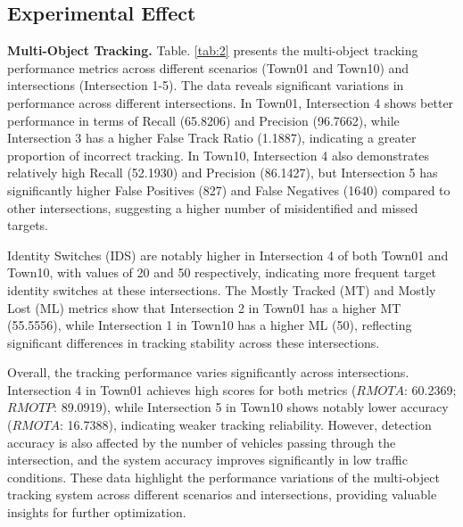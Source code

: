 \documentclass[lettersize,journal]{IEEEtran}
\begin{document}
\subsection{Experimental Effect}

\textbf{Multi-Object Tracking.}
Table. \ref{tab:2} presents the multi-object tracking performance metrics across different scenarios (Town01 and Town10) and intersections (Intersection 1-5). 
The data reveals significant variations in performance across different intersections. 
In Town01, Intersection 4 shows better performance in terms of Recall (65.8206) and Precision (96.7662), while Intersection 3 has a higher False Track Ratio (1.1887), indicating a greater proportion of incorrect tracking. 
In Town10, Intersection 4 also demonstrates relatively high Recall (52.1930) and Precision (86.1427), but Intersection 5 has significantly higher False Positives (827) and False Negatives (1640) compared to other intersections, suggesting a higher number of misidentified and missed targets.

Identity Switches (IDS) are notably higher in Intersection 4 of both Town01 and Town10, with values of 20 and 50 respectively, indicating more frequent target identity switches at these intersections. 
The Mostly Tracked (MT) and Mostly Lost (ML) metrics show that Intersection 2 in Town01 has a higher MT (55.5556), while Intersection 1 in Town10 has a higher ML (50), reflecting significant differences in tracking stability across these intersections.

Overall, the tracking performance varies significantly across intersections. Intersection 4 in Town01 achieves high scores for both metrics (\(RMOTA\): 60.2369; \(RMOTP\): 89.0919), while Intersection 5 in Town10 shows notably lower accuracy (\(RMOTA\): 16.7388), indicating weaker tracking reliability.
However, detection accuracy is also affected by the number of vehicles passing through the intersection, and the system accuracy improves significantly in low traffic conditions.
These data highlight the performance variations of the multi-object tracking system across different scenarios and intersections, providing valuable insights for further optimization.
\end{document}
